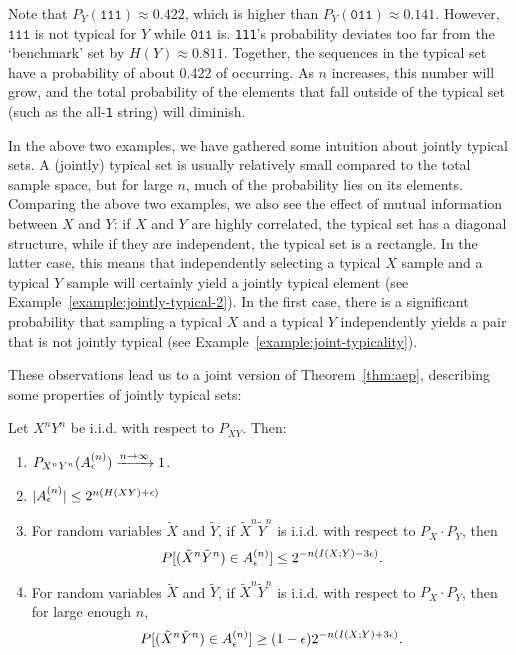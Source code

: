 \begin{example}
\begin{center}
\end{center}
Note that $P_Y(\texttt{111}) \approx 0.422$, which is higher than $P_Y(\texttt{011}) \approx 0.141$. However, $\texttt{111}$ is not typical for $Y$ while $\texttt{011}$ is. \texttt{111}'s probability deviates too far from the `benchmark' set by $H(Y) \approx 0.811$. Together, the sequences in the typical set have a probability of about 0.422 of occurring. As $n$ increases, this number will grow, and the total probability of the elements that fall outside of the typical set (such as the all-\texttt{1} string) will diminish.
\end{example}

In the above two examples, we have gathered some intuition about jointly typical sets. A (jointly) typical set is usually relatively small compared to the total sample space, but for large $n$, much of the probability lies on its elements. Comparing the above two examples, we also see the effect of mutual information between $X$ and $Y$: if $X$ and $Y$ are highly correlated, the typical set has a diagonal structure, while if they are independent, the typical set is a rectangle. In the latter case, this means that independently selecting a typical $X$ sample and a typical $Y$ sample will certainly yield a jointly typical element (see Example~\ref{example:jointly-typical-2}). In the first case, there is a significant probability that sampling a typical $X$ and a typical $Y$ independently yields a pair that is not jointly typical (see Example~\ref{example:joint-typicality}).

These observations lead us to a joint version of Theorem~\ref{thm:aep}, describing some properties of jointly typical sets:

\begin{theorem}\label{thm:joint-aep}
Let $X^nY^n$ be i.i.d. with respect to $P_{XY}$. Then:
\begin{enumerate}
\item $P_{X^nY^n}(A_{\epsilon}^{(n)}) \xrightarrow{n \to \infty} 1$.
\item $|A_{\epsilon}^{(n)}| \leq 2^{n(H(XY) + \epsilon)}$
\item For random variables $\tilde{X}$ and $\tilde{Y}$, if $\tilde{X}^n\tilde{Y}^n$ is i.i.d. with respect to $P_X \cdot P_Y$, then
\[P[(\tilde{X}^n\tilde{Y}^n) \in A_{\epsilon}^{(n)}] \leq 2^{-n(I(X;Y) - 3\epsilon)}.\]
\item For random variables $\tilde{X}$ and $\tilde{Y}$, if $\tilde{X}^n\tilde{Y}^n$ is i.i.d. with respect to $P_X \cdot P_Y$, then for large enough $n$, \[P[(\tilde{X}^n\tilde{Y}^n) \in A_{\epsilon}^{(n)}] \geq (1-\epsilon)2^{-n(I(X;Y) + 3 \epsilon)}.\]
\end{enumerate}
\end{theorem}


